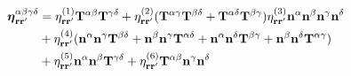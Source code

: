 \documentclass[b5paper,openright,11pt]{book}
\begin{document}
\begin{appendices}
\begin{align}
\boldsymbol{\eta}_{{\bf r}{\bf r}'}^{\alpha\beta\gamma\delta}  
&=
\eta^{(1)}_{{\bf r}{\bf r}'}{\bf T}^{\alpha\beta}{\bf T}^{\gamma\delta}
+\eta^{(2)}_{{\bf r}{\bf r}'}({\bf T}^{\alpha\gamma}{\bf T}^{\beta\delta}
+{\bf T}^{\alpha\delta}{\bf T}^{\beta\gamma}) 
\eta^{(3)}_{{\bf r}{\bf r}'} {\bf n}^\alpha  {\bf n}^\beta   {\bf n}^\gamma   {\bf n}^\delta 
\nonumber\\
&+\eta^{(4)}_{{\bf r}{\bf r}'}(
{\bf n}^\alpha  {\bf n}^\gamma {\bf T}^{\beta\delta}+ 
{\bf n}^\beta  {\bf n}^\gamma {\bf T}^{\alpha\delta}+ 
{\bf n}^\alpha  {\bf n}^\delta {\bf T}^{\beta\gamma}+ 
{\bf n}^\beta  {\bf n}^\delta {\bf T}^{\alpha\gamma}) 
\nonumber \\
&+\eta^{(5)}_{{\bf r}{\bf r}'}{\bf n}^\alpha  {\bf n}^\beta {\bf T}^{\gamma\delta} 
+\eta^{(6)}_{{\bf r}{\bf r}'}{\bf T}^{\alpha\beta} {\bf n}^\gamma  {\bf n}^\delta 
\label{viscosityTangential}
\end{align}
%
%

\end{appendices}
\end{document}
